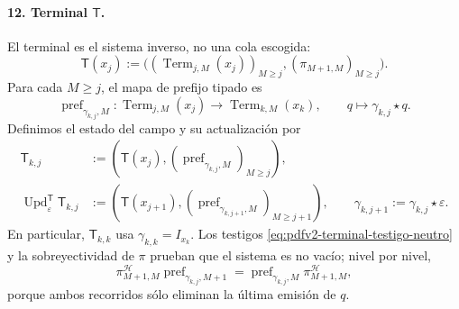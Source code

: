 \paragraph{12. Terminal \(\mathsf T\).}
El terminal es el sistema inverso, no una cola escogida:
\begin{equation}
\label{eq:pdfv2-terminal-sistema-inverso-campo}
 \mathsf T(x_j):=
 \bigl((\operatorname{Term}_{j,M}(x_j))_{M\geq j},
       (\pi_{M+1,M})_{M\geq j}\bigr).
\end{equation}
Para cada \(M\geq j\), el mapa de prefijo tipado es
\begin{equation}
\label{eq:pdfv2-terminal-update-t}
 \operatorname{pref}_{\gamma_{k,j},M}:
 \operatorname{Term}_{j,M}(x_j)\longrightarrow
 \operatorname{Term}_{k,M}(x_k),\qquad
 q\longmapsto\gamma_{k,j}\star q.
\end{equation}
Definimos el estado del campo y su actualización por
\begin{align}
 \mathsf T_{k,j}
 &:=
 \left(\mathsf T(x_j),
   (\operatorname{pref}_{\gamma_{k,j},M})_{M\geq j}\right),
 \label{eq:pdfv2-terminal-estado-t}\\
 \operatorname{Upd}^{\mathsf T}_{\varepsilon}\mathsf T_{k,j}
 &:=
 \left(\mathsf T(x_{j+1}),
   (\operatorname{pref}_{\gamma_{k,j+1},M})_{M\geq j+1}\right),
 \qquad \gamma_{k,j+1}:=\gamma_{k,j}\star\varepsilon.
 \label{eq:pdfv2-terminal-update-t-explicita}
\end{align}
En particular, \(\mathsf T_{k,k}\) usa
\(\gamma_{k,k}=I_{x_k}\). Los testigos
\eqref{eq:pdfv2-terminal-testigo-neutro} y la sobreyectividad de \(\pi\)
prueban que el sistema es no vacío; nivel por nivel,
\begin{equation}
\label{eq:pdfv2-terminal-prefijo-natural}
 \pi^{\mathscr H}_{M+1,M}
 \operatorname{pref}_{\gamma_{k,j},M+1}
 =\operatorname{pref}_{\gamma_{k,j},M}
  \pi^{\mathscr H}_{M+1,M},
\end{equation}
porque ambos recorridos sólo eliminan la última emisión de \(q\).

